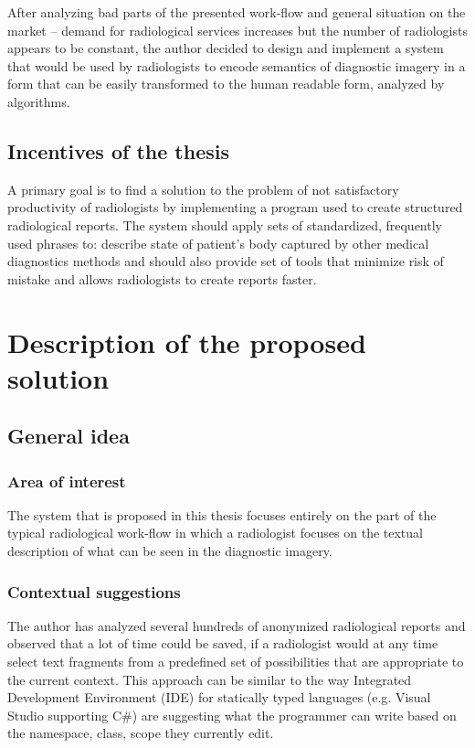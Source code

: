 \documentclass[12pt, twoside, openany]{report}
\theoremstyle{definition}
\begin{document}
After analyzing bad parts of the presented work-flow and general situation on the market -- demand for radiological services increases but the number of radiologists appears to be constant, the author decided to design and implement a system that would be used by radiologists to encode semantics of diagnostic imagery in a form that can be easily transformed to the human readable form, analyzed by algorithms. 

\section{Incentives of the thesis}
A primary goal is to find a solution to the problem of not satisfactory productivity of radiologists by implementing a program used to create structured radiological reports. The system should apply sets of standardized, frequently used phrases to: describe state of patient's body captured by other medical diagnostics methods and should also provide set of tools that minimize risk of mistake and allows radiologists to create reports faster. 



\chapter{Description of the proposed solution}
\section{General idea}
\subsection{Area of interest}
The system that is proposed in this thesis focuses entirely on the part of the typical radiological work-flow in which a radiologist focuses on the textual description of what can be seen in the diagnostic imagery.
\subsection{Contextual suggestions}
The author has analyzed several hundreds of anonymized radiological reports and observed that a lot of time could be saved, if a radiologist would at any time select text fragments from a predefined set of possibilities that are appropriate to the current context. This approach can be similar to the way Integrated Development Environment (IDE) for statically typed languages (e.g. Visual Studio supporting C\#) are suggesting what the programmer can write based on the namespace, class, scope they currently edit.
\end{document}
